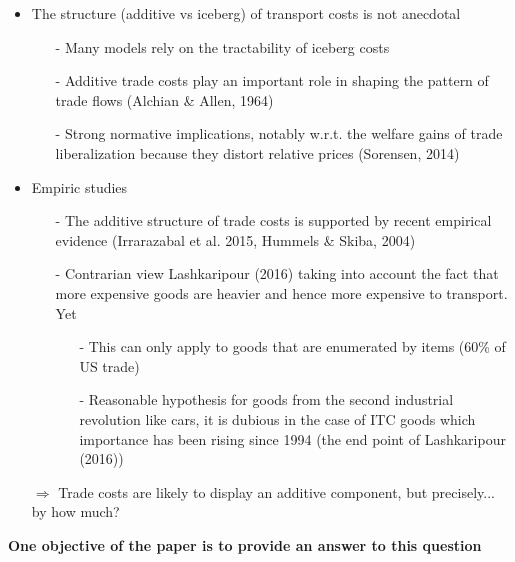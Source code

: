 \documentclass[10 pt,Helvetica, french]{beamer}
\begin{document}
\begin{frame}
\begin{itemize}
\item The structure (additive vs iceberg) of transport costs is not anecdotal \vspace{0.2cm}
\begin{itemize}
\item[-] Many models rely on the tractability of iceberg costs \vspace{0.1cm}
\item[-] Additive trade costs play an important role in shaping the pattern of trade flows (Alchian \& Allen, 1964) \vspace{0.1cm}
\item[-] Strong normative implications, notably w.r.t. the welfare gains of trade liberalization because they distort relative prices (Sorensen, 2014)\vspace{0.1cm}
\end{itemize}
\item Empiric studies
\begin{itemize}
\item[-] The additive structure of trade costs is supported by recent empirical evidence (Irrarazabal et al. 2015, Hummels \& Skiba, 2004)  \vspace{0.1cm}
\item[-] Contrarian view  Lashkaripour (2016) taking into account the fact that more expensive goods are heavier and hence more expensive to transport. Yet  \vspace{0.1cm}
\begin{itemize}
\item[-] This can only apply to goods that are enumerated by items (60\% of US trade)
\item[-] Reasonable hypothesis for goods from the second industrial revolution like cars, it is dubious in the case of ITC goods which importance has been rising since 1994 (the end point of Lashkaripour (2016))
\end{itemize}
\end{itemize}
\item[$\Rightarrow$] Trade costs are likely to display an additive component, but precisely... by how much? \vspace{0.2cm}
\end{itemize}
\textbf{One objective of the paper is to provide an answer to this question}

\end{frame}
\end{document}
